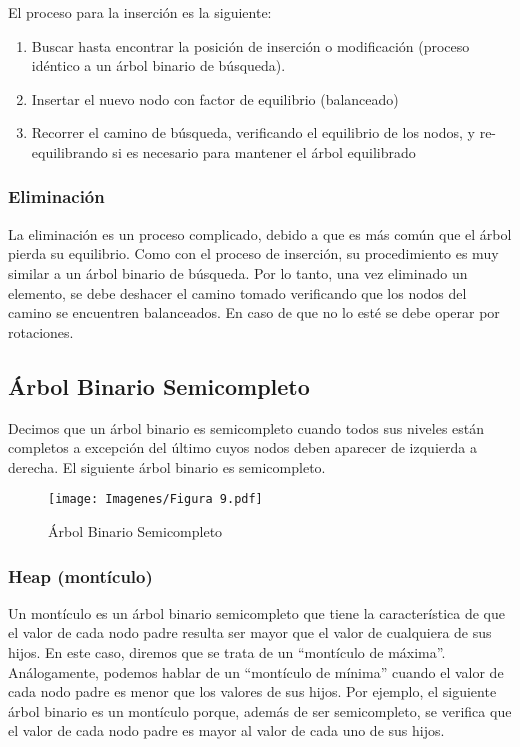 \documentclass[12pt]{article}
\begin{document}
El proceso para la inserción es la siguiente:

\begin{enumerate}
    \item Buscar hasta encontrar la posición de inserción o modificación (proceso idéntico a un árbol binario de búsqueda).
    \item Insertar el nuevo nodo con factor de equilibrio (balanceado)
    \item Recorrer el camino de búsqueda, verificando el equilibrio de los nodos, y re-equilibrando si es necesario para mantener el árbol equilibrado
\end{enumerate}

\subsubsection{Eliminación}
La eliminación es un proceso complicado,  debido a que es más común que el árbol pierda su equilibrio. Como con el proceso de inserción, su procedimiento es muy similar a un árbol binario de búsqueda. Por lo tanto, una vez eliminado un elemento, se debe deshacer el camino tomado verificando que los nodos del camino se encuentren balanceados. En caso de que no lo esté se debe operar por rotaciones.

\subsection{Árbol Binario Semicompleto}

Decimos que un árbol binario es semicompleto cuando todos sus niveles están completos a excepción del último cuyos nodos deben aparecer de izquierda a derecha. El siguiente árbol binario es semicompleto.

\begin{figure}[H]
   \centering
   \texttt{[image: Imagenes/Figura 9.pdf]}
   \caption{Árbol Binario Semicompleto}
   \label{fig_label}
\end{figure}

\subsubsection{Heap (montículo)}

Un montículo es un árbol binario semicompleto que tiene la característica de que el valor de cada nodo padre resulta ser mayor que el valor de cualquiera de sus hijos. En este caso, diremos que se trata de un “montículo de máxima”. Análogamente, podemos hablar de un “montículo de mínima” cuando el valor de cada nodo padre es menor que los valores de sus hijos. Por ejemplo, el siguiente árbol binario es un montículo porque, además de ser semicompleto, se verifica que el valor de cada nodo padre es mayor al valor de cada uno de sus hijos.
\end{document}
